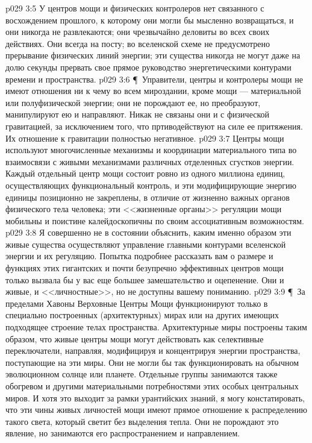 \vs p029 3:5 У центров мощи и физических контролеров нет связанного с восхождением прошлого, к которому они могли бы мысленно возвращаться, и они никогда не развлекаются; они чрезвычайно деловиты во всех своих действиях. Они всегда на посту; во вселенской схеме не предусмотрено прерывание физических линий энергии; эти существа никогда не могут даже на долю секунды прервать свое прямое руководство энергетическими контурами времени и пространства.
\vs p029 3:6 \P\ Управители, центры и контролеры мощи не имеют отношения ни к чему во всем мироздании, кроме мощи --- материальной или полуфизической энергии; они не порождают ее, но преобразуют, манипулируют ею и направляют. Никак не связаны они и с физической гравитацией, за исключением того, что пртиводействуют на силе ее притяжения. Их отношение к гравитации полностью негативное.
\vs p029 3:7 Центры мощи используют многочисленные механизмы и координации материального типа во взаимосвязи с живыми механизмами различных отделенных сгустков энергии. Каждый отдельный центр мощи состоит ровно из одного миллиона единиц, осуществляющих функциональный контроль, и эти модифицирующие энергию единицы позиционно не закреплены, в отличие от жизненно важных органов физического тела человека; эти <<жизненные органы>> регуляции мощи мобильны и поистине калейдоскопичны по своим ассоциативным возможностям.
\vs p029 3:8 Я совершенно не в состоянии объяснить, каким именно образом эти живые существа осуществляют управление главными контурами вселенской энергии и их регуляцию. Попытка подробнее рассказать вам о размере и функциях этих гигантских и почти безупречно эффективных центров мощи только вызвала бы у вас еще большее замешательство и оцепенение. Они и живые, и <<личностные>>, но не доступны вашему пониманию.
\vs p029 3:9 \P\ За пределами Хавоны Верховные Центры Мощи функционируют только в специально построенных (архитектурных) мирах или на других имеющих подходящее строение телах пространства. Архитектурные миры построены таким образом, что живые центры мощи могут действовать как селективные переключатели, направляя, модифицируя и концентрируя энергии пространства, поступающие на эти миры. Они не могли бы так функционировать на обычном эволюционном солнце или планете. Отдельные группы занимаются также обогревом и другими материальными потребностями этих особых центральных миров. И хотя это выходит за рамки урантийских знаний, я могу констатировать, что эти чины живых личностей мощи имеют прямое отношение к распределению такого света, который светит без выделения тепла. Они не порождают это явление, но занимаются его распространением и направлением.
